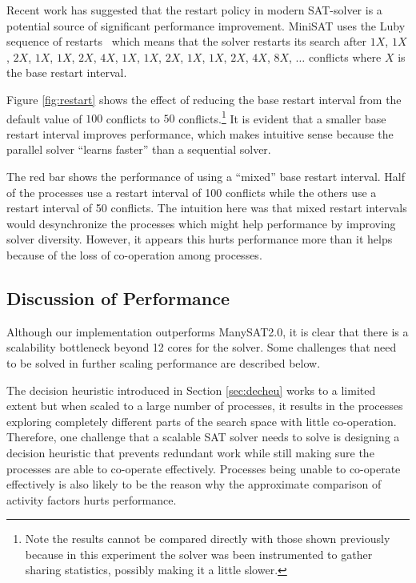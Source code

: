 \documentclass[letterpaper, compsoc, conference]{IEEEtran}
\begin{document}
Recent work \cite{HuangRestart2007} has suggested that the restart policy in
modern SAT-solver is a potential source of significant performance improvement.
MiniSAT uses the Luby sequence of restarts~\cite{Luby93optimalspeedup}
which means that the solver restarts its search after $1X$, $1X$, $2X$, $1X$, $1X$,
$2X$, $4X$, $1X$, $1X$, $2X$, $1X$, $1X$, $2X$, $4X$, $8X$, $\dots$ conflicts
where $X$ is the base restart interval. 

Figure \ref{fig:restart} shows the effect of reducing the base restart interval
from the default value of $100$ conflicts to $50$ conflicts.\footnote{Note the
results cannot be compared directly with those shown previously because in this
experiment the solver was been instrumented to gather sharing statistics,
possibly making it a little slower.} It is evident that a smaller base restart
interval improves performance, which makes intuitive sense because the parallel
solver ``learns faster'' than a sequential solver. 

The red bar shows the performance of using a ``mixed'' base restart interval.
Half of the processes use a restart interval of 100 conflicts while the others use a
restart interval of 50 conflicts. The intuition here was that mixed restart
intervals would desynchronize the processes which might help performance by
improving solver diversity. However, it appears this hurts performance more
than it helps because of the loss of co-operation among processes.

\subsection{Discussion of Performance}
\label{sec:disc}

Although our implementation outperforms ManySAT2.0, it is clear that there is
a scalability bottleneck beyond 12 cores for the solver.  Some challenges
that need to be solved in further scaling performance are described below.

The decision heuristic introduced in Section \ref{sec:decheu} works to a
limited extent but when scaled to a large number of processes, it results in
the processes exploring completely different parts of the search space with
little co-operation. Therefore, one challenge that a scalable SAT solver needs
to solve is designing a decision heuristic that prevents redundant work while
still making sure the processes are able to co-operate effectively.  Processes
being unable to co-operate effectively is also likely to be the reason why the
approximate comparison of activity factors hurts performance.
\end{document}

